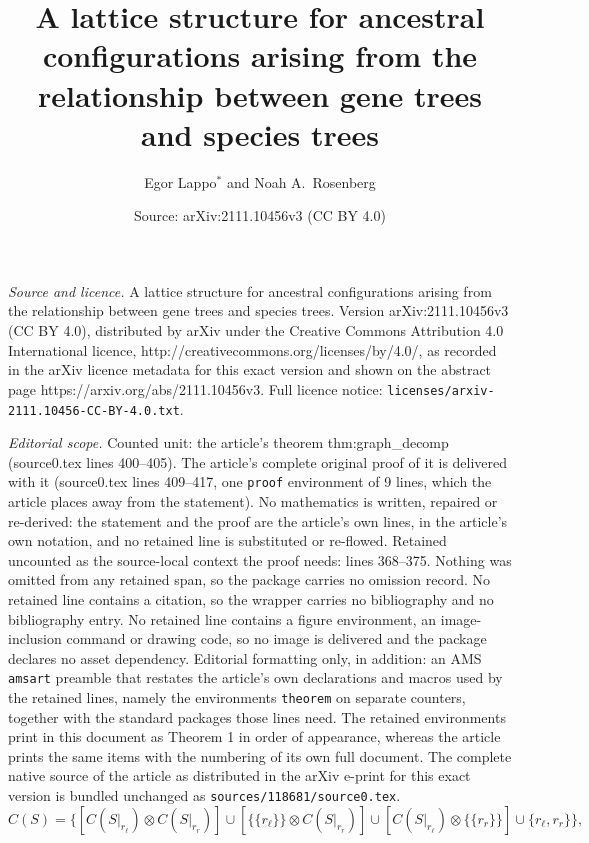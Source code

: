 \documentclass[10pt,a4paper]{amsart}
\title{A lattice structure for ancestral configurations arising from the relationship between gene trees and species trees}
\author{Egor Lappo$^*$ and Noah A.\ Rosenberg}
\date{Source: arXiv:2111.10456v3 (CC BY 4.0)}
\begin{document}
\maketitle

\noindent\emph{Source and licence.} A lattice structure for ancestral configurations arising from the relationship between gene trees and species trees. Version arXiv:2111.10456v3 (CC BY 4.0), distributed by arXiv under the Creative Commons Attribution 4.0 International licence, http://creativecommons.org/licenses/by/4.0/, as recorded in the arXiv licence metadata for this exact version and shown on the abstract page https://arxiv.org/abs/2111.10456v3. Full licence notice: \texttt{licenses/arxiv-2111.10456-CC-BY-4.0.txt}.\par\smallskip

\noindent\textit{Editorial scope.} Counted unit: the article's theorem thm:graph\_decomp (source0.tex lines 400--405). The article's complete original proof of it is delivered with it (source0.tex lines 409--417, one \texttt{proof} environment of 9 lines, which the article places away from the statement). No mathematics is written, repaired or re-derived: the statement and the proof are the article's own lines, in the article's own notation, and no retained line is substituted or re-flowed.  Retained uncounted as the source-local context the proof needs: lines 368--375.  Nothing was omitted from any retained span, so the package carries no omission record.  No retained line contains a citation, so the wrapper carries no bibliography and no bibliography entry.  No retained line contains a figure environment, an image-inclusion command or drawing code, so no image is delivered and the package declares no asset dependency.  Editorial formatting only, in addition: an AMS \texttt{amsart} preamble that restates the article's own declarations and macros used by the retained lines, namely the environments \texttt{theorem} on separate counters, together with the standard packages those lines need.  The retained environments print in this document as Theorem 1 in order of appearance, whereas the article prints the same items with the numbering of its own full document.  The complete native source of the article as distributed in the arXiv e-print for this exact version is bundled unchanged as \texttt{sources/118681/source0.tex}.
\begin{equation}
\label{eq:recur_enum}
	C(S) = \{ 
	\left[C(S|_{r_\ell}) \otimes C(S|_{r_r})\right] \cup 
	\left[\{\{r_\ell\}\} \otimes C(S|_{r_r})\right] \cup
    \left[C(S|_{r_\ell}) \otimes \{\{r_r\}\}\right] \cup 
	\{r_\ell,r_r\}\},
\end{equation}
\end{document}
